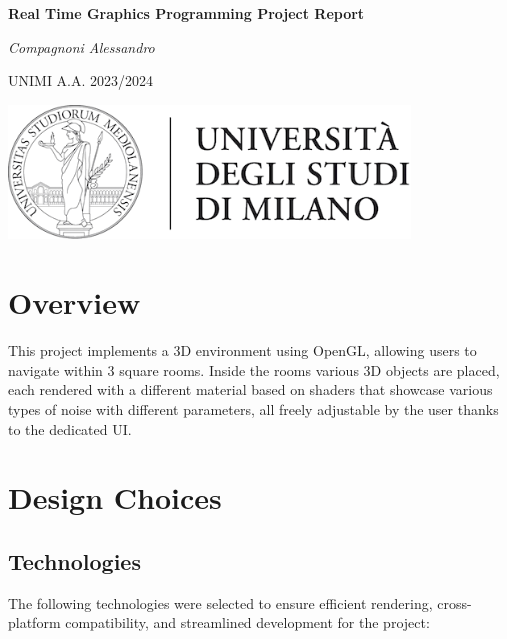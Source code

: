 \documentclass[12pt]{article}
\begin{document}
\begin{titlepage}
    \centering
    \vspace*{2cm}
    {\Huge\bfseries Real Time Graphics Programming Project Report\par}
    \vspace{1.5cm}
    {\Large\itshape Compagnoni Alessandro\par}
    \vspace{0.5cm}
   {\large UNIMI A.A. 2023/2024\par}
    \vfill
    \includegraphics[width=0.8\textwidth]{Images/logoUnimi.png} 
    \vfill
\end{titlepage}

\tableofcontents
\newpage

\section{Overview}
\label{sec:overview}

This project implements a 3D environment using OpenGL, allowing users to navigate within 3 square rooms. Inside the rooms various 3D objects are placed, each rendered with a different material based on shaders that showcase various types of noise with different parameters, all freely adjustable by the user thanks to the dedicated UI.

\section{Design Choices}
\label{sec:project_details}
\subsection{Technologies}
The following technologies were selected to ensure efficient rendering, cross-platform compatibility, and streamlined development for the project:
\end{document}
